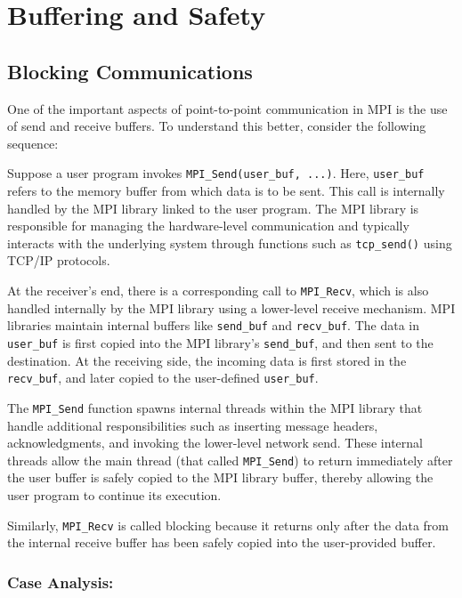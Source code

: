\documentclass[12pt]{book}
\begin{document}
\section{Buffering and Safety}

\subsection{Blocking Communications}

One of the important aspects of point-to-point communication in MPI is the use of send and receive buffers. To understand this better, consider the following sequence:

Suppose a user program invokes \texttt{MPI\_Send(user\_buf, ...)}. Here, \texttt{user\_buf} refers to the memory buffer from which data is to be sent. This call is internally handled by the MPI library linked to the user program. The MPI library is responsible for managing the hardware-level communication and typically interacts with the underlying system through functions such as \texttt{tcp\_send()} using TCP/IP protocols.

At the receiver’s end, there is a corresponding call to \texttt{MPI\_Recv}, which is also handled internally by the MPI library using a lower-level receive mechanism. MPI libraries maintain internal buffers like \texttt{send\_buf} and \texttt{recv\_buf}. The data in \texttt{user\_buf} is first copied into the MPI library’s \texttt{send\_buf}, and then sent to the destination. At the receiving side, the incoming data is first stored in the \texttt{recv\_buf}, and later copied to the user-defined \texttt{user\_buf}.

The \texttt{MPI\_Send} function spawns internal threads within the MPI library that handle additional responsibilities such as inserting message headers, acknowledgments, and invoking the lower-level network send. These internal threads allow the main thread (that called \texttt{MPI\_Send}) to return immediately after the user buffer is safely copied to the MPI library buffer, thereby allowing the user program to continue its execution.

Similarly, \texttt{MPI\_Recv} is called blocking because it returns only after the data from the internal receive buffer has been safely copied into the user-provided buffer.

\subsubsection*{Case Analysis:}
\end{document}
